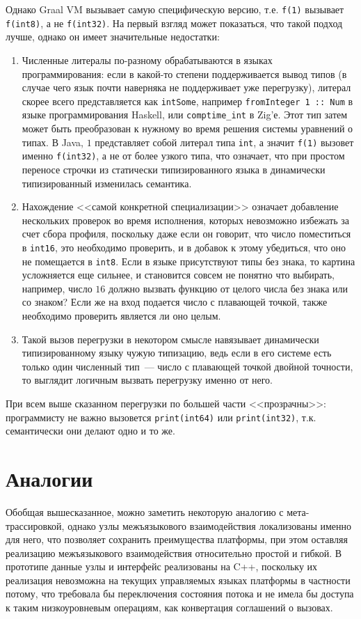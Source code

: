 \documentclass[times
,titlepage
]{itmo-student-thesis}
\begin{document}
Однако Graal VM вызывает самую специфическую версию, т.е. \texttt{f(1)} вызывает \texttt{f(int8)}, а не \texttt{f(int32)}. На первый взгляд может показаться, что такой подход лучше, однако он имеет значительные недостатки:
\begin{enumerate}
	\item Численные литералы по-разному обрабатываются в языках программирования: если в какой-то степени поддерживается вывод типов (в случае чего язык почти наверняка не поддерживает уже перегрузку), литерал скорее всего представляется как \texttt{intSome}, например \texttt{fromInteger 1 :: Num} в языке программирования Haskell, или \texttt{comptime\_int} в Zig'е. Этот тип затем может быть преобразован к нужному во время решения системы уравнений о типах. В Java, $1$ представляет собой литерал типа \texttt{int}, а значит \texttt{f(1)} вызовет именно \texttt{f(int32)}, а не от более узкого типа, что означает, что при простом переносе строчки из статически типизированного языка в динамически типизированный изменилась семантика.
	\item Нахождение <<самой конкретной специализации>> означает добавление нескольких проверок во время исполнения, которых невозможно избежать за счет сбора профиля, поскольку даже если он говорит, что число поместиться в \texttt{int16}, это необходимо проверить, и в добавок к этому убедиться, что оно не помещается в \texttt{int8}. Если в языке присутствуют типы без знака, то картина усложняется еще сильнее, и становится совсем не понятно что выбирать, например, число $16$ должно вызвать функцию от целого числа без знака или со знаком? Если же на вход подается число с плавающей точкой, также необходимо проверить является ли оно целым.
	\item Такой вызов перегрузки в некотором смысле навязывает динамически типизированному языку чужую типизацию, ведь если в его системе есть только один численный тип~--- число с плавающей точкой двойной точности, то выглядит логичным вызвать перегрузку именно от него.
\end{enumerate}
При всем выше сказанном перегрузки по большей части <<прозрачны>>: программисту не важно вызовется \texttt{print(int64)} или \texttt{print(int32)}, т.к. семантически они делают одно и то же.

\section{Аналогии}
Обобщая вышесказанное, можно заметить некоторую аналогию с мета-трассировкой, однако узлы межъязыкового взаимодействия локализованы именно для него, что позволяет сохранить преимущества платформы, при этом оставляя реализацию межъязыкового взаимодействия относительно простой и гибкой. В прототипе данные узлы и интерфейс реализованы на C++, поскольку их реализация невозможна на текущих управляемых языках платформы в частности потому, что требовала бы переключения состояния потока и не имела бы доступа к таким низкоуровневым операциям, как конвертация соглашений о вызовах.
\end{document}
